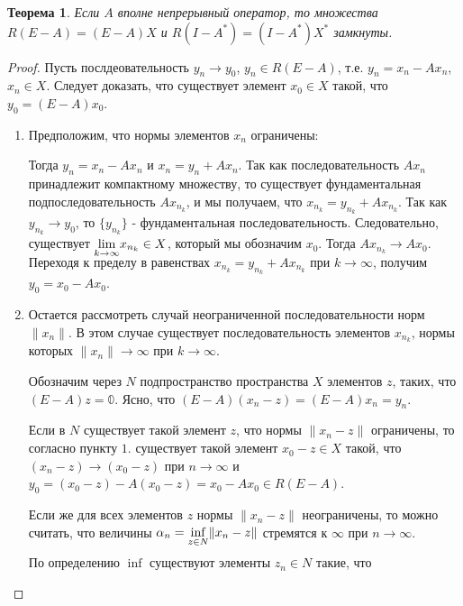 \documentclass[12pt,a4paper,titlepage,oneside]{book}
\theoremstyle{definition}
\theoremstyle{plain}
\newtheorem*{theorem}{Теорема}
\theoremstyle{break}
\theoremstyle{remark}
\theoremstyle{remark}
\theoremstyle{remark}
\theoremstyle{remark}
\theoremstyle{plain}
\theoremstyle{plain}
\begin{document}
\begin{theorem}
Если $A$ вполне непрерывный оператор, то множества $R(E-A)=(E-A)X$ и $R(I-A^*)=(I-A^*)X^*$ замкнуты.
\end{theorem}
\begin{proof}
Пусть послдеовательность $y_n \rightarrow y_0$, $y_n \in R(E-A)$, т.е. $y_n=x_n-Ax_n$, $x_n \in X$. Следует доказать, что существует элемент $x_0 \in X$ такой, что $y_0=(E-A)x_0$.
\begin{enumerate}

	\item Предположим, что нормы элементов $x_n$ ограничены:

Тогда $y_n=x_n-Ax_n$ и $x_n=y_n+Ax_n$. Так как последовательность $Ax_n$ принадлежит компактному множеству, то существует фундаментальная подпоследовательность $Ax_{n_k}$, и мы получаем, что $x_{n_k}=y_{n_k}+Ax_{n_k}$. Так как $y_{n_k} \rightarrow y_0$, то $\{y_{n_k}\}$ - фундаментальная последовательность. Следовательно, существует $\smash{\displaystyle\lim_{k \rightarrow \infty}} x_{n_k} \in X$, который мы обозначим $x_0$. Тогда $Ax_{n_k} \rightarrow Ax_0$. Переходя к пределу в равенствах $x_{n_k}=y_{n_k}+Ax_{n_k}$ при $k \rightarrow \infty$, получим $y_0=x_0-Ax_0$.
	
	\item Остается рассмотреть случай неограниченной последовательности норм $\lVert x_n \rVert$. В этом случае существует последовательность элементов $x_{n_k}$, нормы которых $\lVert x_n \rVert \rightarrow \infty$ при $k \rightarrow \infty$.
	
	Обозначим через $N$ подпространство пространства $X$ элементов $z$, таких, что $(E-A)z=\mathbb{0}$. Ясно, что $(E-A)(x_n-z)=(E-A)x_n=y_n$.
	
	Если в $N$ существует такой элемент $z$, что нормы $\lVert x_n-z \rVert$ ограничены, то согласно пункту $1.$ существует такой элемент $x_0-z \in X$ такой, что $(x_n-z)\rightarrow (x_0-z)$ при $n \rightarrow \infty$ и $y_0=(x_0-z)-A(x_0-z)=x_0-Ax_0 \in R(E-A)$.
	
	Если же для всех элементов $z$ нормы $\lVert x_n-z \rVert$ неограничены, то можно считать, что величины $\alpha_n=\smash{\displaystyle\inf_{z \in N}} \lVert x_n-z \rVert$ стремятся к $\infty$ при $n \rightarrow \infty$.
	
	По определению $\inf$ существуют элементы $z_n \in N$ такие, что 
	

\end{enumerate}
\end{proof}
\end{document}
